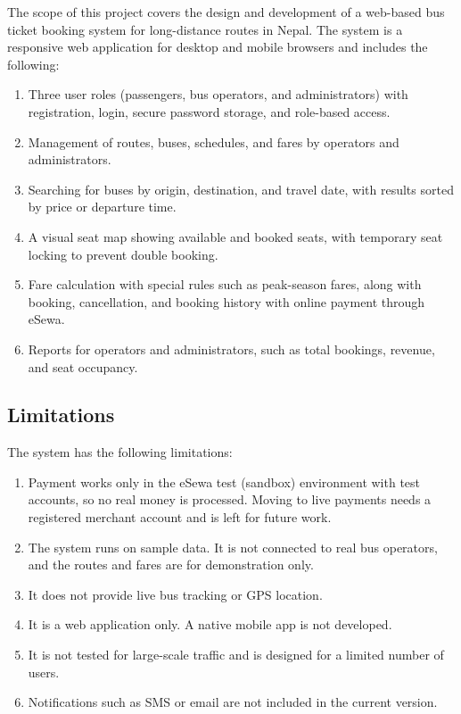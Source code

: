 The scope of this project covers the design and development of a web-based bus ticket booking system for long-distance routes in Nepal. The system is a responsive web application for desktop and mobile browsers and includes the following:
\begin{enumerate}
  \item Three user roles (passengers, bus operators, and administrators) with registration, login, secure password storage, and role-based access.
  \item Management of routes, buses, schedules, and fares by operators and administrators.
  \item Searching for buses by origin, destination, and travel date, with results sorted by price or departure time.
  \item A visual seat map showing available and booked seats, with temporary seat locking to prevent double booking.
  \item Fare calculation with special rules such as peak-season fares, along with booking, cancellation, and booking history with online payment through eSewa.
  \item Reports for operators and administrators, such as total bookings, revenue, and seat occupancy.
\end{enumerate}

\subsection{Limitations}

The system has the following limitations:
\begin{enumerate}
  \item Payment works only in the eSewa test (sandbox) environment with test accounts, so no real money is processed. Moving to live payments needs a registered merchant account and is left for future work.
  \item The system runs on sample data. It is not connected to real bus operators, and the routes and fares are for demonstration only.
  \item It does not provide live bus tracking or GPS location.
  \item It is a web application only. A native mobile app is not developed.
  \item It is not tested for large-scale traffic and is designed for a limited number of users.
  \item Notifications such as SMS or email are not included in the current version.
\end{enumerate}

